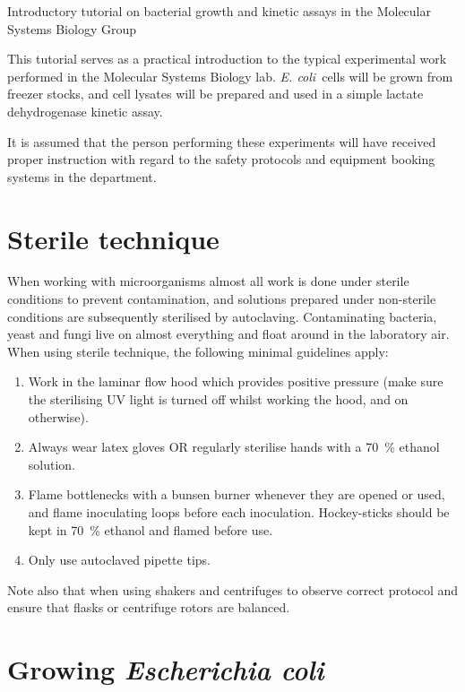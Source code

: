 \documentclass[a4paper]{article}
\newcommand{\ec}{\textit{E. coli}}
\begin{document}
 \begin{center} \huge Introductory tutorial on bacterial growth
and kinetic assays in the Molecular Systems Biology Group\\ \normalsize
\end{center} 

\begin{multicols}{2} This tutorial serves as a practical introduction to the
typical experimental work performed in the Molecular Systems Biology lab. \ec\
cells will be grown from freezer stocks, and cell lysates will be prepared and
used in a simple lactate dehydrogenase kinetic assay.

It is assumed that the person performing these experiments will have received
proper instruction with regard to the safety protocols and equipment booking
systems in the department.

\section{Sterile technique} 

When working with microorganisms almost all work is done under sterile
conditions to prevent contamination, and solutions prepared under non-sterile
conditions are subsequently sterilised by autoclaving. Contaminating bacteria,
yeast and fungi live on almost everything and float around in the laboratory
air. When using sterile technique, the following minimal guidelines apply:

\begin{enumerate} 
\item Work in the laminar flow hood which provides positive
pressure (make sure the sterilising UV light is turned off whilst working the
hood, and on otherwise).  
\item Always wear latex gloves OR regularly sterilise
hands with a 70~\% ethanol solution.  
\item Flame bottlenecks with a bunsen
burner whenever they are opened or used, and flame inoculating loops before
each inoculation. Hockey-sticks should be kept in 70~\% ethanol and flamed
before use.  
\item Only use autoclaved pipette tips.  
\end{enumerate}

Note also that when using shakers and centrifuges to observe correct protocol
and ensure that flasks or centrifuge rotors are balanced.

\section{Growing \textit{Escherichia coli}} 


\end{multicols}
\end{document}
